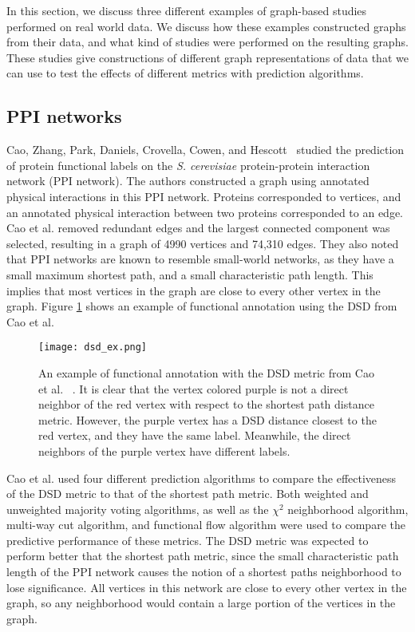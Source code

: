 In this section, we discuss three different examples of graph-based studies performed on real world data. We discuss how these examples constructed graphs from their data, and what kind of studies were performed on the resulting graphs. These studies give constructions of different graph representations of data that we can use to test the effects of different metrics with prediction algorithms.

\subsection{PPI networks}
Cao, Zhang, Park, Daniels, Crovella, Cowen, and Hescott~\cite{10.1371/journal.pone.0076339} studied the prediction of protein functional labels on the \emph{S. cerevisiae} protein-protein interaction network (PPI network). The authors constructed a graph using annotated physical interactions in this PPI network. Proteins corresponded to vertices, and an annotated physical interaction between two proteins corresponded to an edge. Cao et al. removed redundant edges and the largest connected component was selected, resulting in a graph of 4990 vertices and 74,310 edges. They also noted that PPI networks are known to resemble small-world networks, as they have a small maximum shortest path, and a small characteristic path length. This implies that most vertices in the graph are close to every other vertex in the graph. Figure \ref{fig:PPI_example} shows an example of functional annotation using the DSD from Cao et al.

\begin{figure}[h]
\centering
\texttt{[image: dsd\_ex.png]}
\caption{An example of functional annotation with the DSD metric from Cao et al. ~\cite{10.1371/journal.pone.0076339}. It is clear that the vertex colored purple is not a direct neighbor of the red vertex with respect to the shortest path distance metric. However, the purple vertex has a DSD distance closest to the red vertex, and they have the same label. Meanwhile, the direct neighbors of the purple vertex have different labels.}
\label{fig:PPI_example}
\end{figure}

Cao et al. used four different prediction algorithms to compare the effectiveness of the DSD metric to that of the shortest path metric. Both weighted and unweighted majority voting algorithms, as well as the $\chi^{2}$ neighborhood algorithm, multi-way cut algorithm, and functional flow algorithm were used to compare the predictive performance of these metrics. The DSD metric was expected to perform better that the shortest path metric, since the small characteristic path length of the PPI network causes the notion of a shortest paths neighborhood to lose significance. All vertices in this network are close to every other vertex in the graph, so any neighborhood would contain a large portion of the vertices in the graph.

